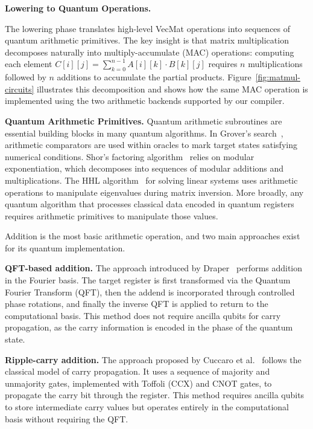 \noindent\textbf{Lowering to Quantum Operations.}
\label{sec:arith_matrix}

The lowering phase translates high-level VecMat operations into sequences of quantum arithmetic primitives. The key insight is that matrix multiplication decomposes naturally into multiply-accumulate (MAC) operations: computing each element $C[i][j] = \sum_{k=0}^{n-1} A[i][k] \cdot B[k][j]$ requires $n$ multiplications followed by $n$ additions to accumulate the partial products. Figure~\ref{fig:matmul-circuits} illustrates this decomposition and shows how the same MAC operation is implemented using the two arithmetic backends supported by our compiler.



\textbf{Quantum Arithmetic Primitives.}
\label{sec:quantum-arithmetic}
Quantum arithmetic subroutines are essential building blocks in many quantum algorithms. In Grover's search~\cite{grover}, arithmetic comparators are used within oracles to mark target states satisfying numerical conditions. Shor's factoring algorithm~\cite{shor} relies on modular exponentiation, which decomposes into sequences of modular additions and multiplications. The HHL algorithm~\cite{hhl} for solving linear systems uses arithmetic operations to manipulate eigenvalues during matrix inversion. More broadly, any quantum algorithm that processes classical data encoded in quantum registers requires arithmetic primitives to manipulate those values.

Addition is the most basic arithmetic operation, and two main approaches exist for its quantum implementation.

\textbf{QFT-based addition.} The approach introduced by Draper~\cite{draper-qft} performs addition in the Fourier basis. The target register is first transformed via the Quantum Fourier Transform (QFT), then the addend is incorporated through controlled phase rotations, and finally the inverse QFT is applied to return to the computational basis. This method does not require ancilla qubits for carry propagation, as the carry information is encoded in the phase of the quantum state.

\textbf{Ripple-carry addition.} The approach proposed by Cuccaro et al.~\cite{cuccaro-ripple} follows the classical model of carry propagation. It uses a sequence of majority and unmajority gates, implemented with Toffoli (CCX) and CNOT gates, to propagate the carry bit through the register. This method requires ancilla qubits to store intermediate carry values but operates entirely in the computational basis without requiring the QFT.

